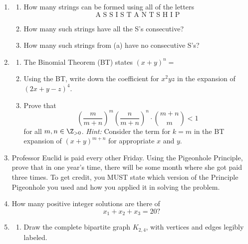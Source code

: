 \documentclass[12pt,letterpaper]{article}
\begin{document}
\begin{enumerate}

\newpage
\item 
\begin{enumerate}
\item How many strings can be formed using all of the letters 
\[\text{A S S I S T A N T S H I P}\]

\vspace{15pc}
\item How many such strings have all the S's consecutive?

\vspace{15pc}
\item How many such strings from (a) have no consecutive S's?
\end{enumerate}

\newpage
\item \begin{enumerate}
\item The Binomial Theorem (BT) states $(x+y)^n=$  

\vspace{2pc}
\item Using the BT, write down the coefficient for $x^2yz$ in the expansion of $(2x+y-z)^4$.

\vspace{12pc}
\item 
Prove that 
\[\left(\frac{m}{m+n}\right)^m\left(\frac{n}{m+n}\right)^n\cdot\binom{m+n}{m}<1\]
for all $m,n\in\Z_{>0}$.  {\it Hint:} Consider the term for $k=m$ in the BT expansion of $(x+y)^{m+n}$ for appropriate $x$ and $y$.

\end{enumerate}

\newpage
\item Professor Euclid is paid every other Friday.  Using the Pigeonhole Principle, prove that in one year's time, there will be some month where she got paid three times.  To get credit, you MUST state which version of the Principle Pigeonhole you used and how you applied it in solving the problem.

\vspace{25pc}
\item How many positive integer solutions are there of
\[x_1+x_2+x_3=20?\]

\newpage
\item \begin{enumerate}
\item Draw the complete bipartite graph $K_{2,4}$, with vertices and edges legibly labeled.


\end{enumerate}
\end{enumerate}
\end{document}
